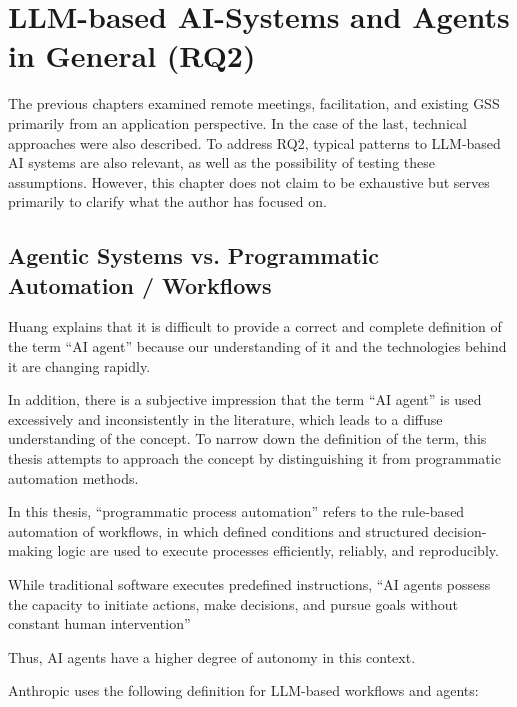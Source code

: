 \section{LLM-based AI-Systems and Agents in General (RQ2)}
\label{sec:ai-agents}

The previous chapters examined remote meetings, facilitation, and existing GSS primarily from an application
perspective. In the case of the last, technical approaches were also described. To address RQ2,
typical patterns to LLM-based AI systems are also relevant, as well as the possibility of testing these
assumptions. However, this chapter does not claim to be exhaustive but serves primarily to clarify what the
author has focused on.

\subsection{Agentic Systems vs. Programmatic Automation / Workflows}
\label{sec:agentic-systems-vs-programmatic-automation-workflows}

Huang explains that it is difficult to provide a correct and complete definition of the term “AI agent”
because our understanding of it and the technologies behind it are changing rapidly. \cite[p.
2]{huangAgenticAITheories2025}

In addition, there is a subjective impression that the term “AI agent” is used excessively and inconsistently
in the literature, which leads to a diffuse understanding of the concept. To narrow down the definition of
the term, this thesis attempts to approach the concept by distinguishing it from programmatic automation methods.

In this thesis, “programmatic process automation” refers to the rule-based automation of
workflows, in which defined conditions and structured decision-making logic are used to execute processes efficiently,
reliably, and reproducibly.

While traditional software executes predefined instructions, “AI agents possess the capacity to initiate
actions, make decisions, and pursue goals without constant human intervention” \cite[p. 2]{huangAgenticAITheories2025}

Thus, AI agents have a higher degree of autonomy in this context.

Anthropic uses the following definition for LLM-based workflows and agents:

